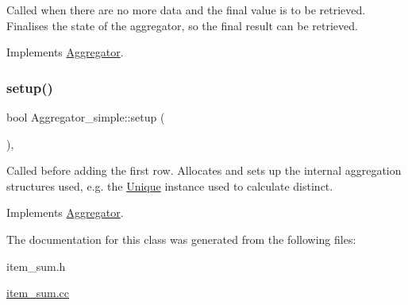 Called when there are no more data and the final value is to be retrieved. Finalises the state of the aggregator, so the final result can be retrieved. 

Implements \mbox{\hyperlink{classAggregator_a726ef59a61b219b87c0a6041f8162037}{Aggregator}}.

\mbox{\label{classAggregator__simple_a5ba27dcd45b797485c888a36a5cc4bd3}} 
\subsubsection{\texorpdfstring{setup()}{setup()}}
{\footnotesize\ttfamily bool Aggregator\+\_\+simple\+::setup (\begin{DoxyParamCaption}\item[{T\+HD $\ast$}]{ }\end{DoxyParamCaption})\hspace{0.3cm}{\ttfamily [inline]}, {\ttfamily [virtual]}}

Called before adding the first row. Allocates and sets up the internal aggregation structures used, e.\+g. the \mbox{\hyperlink{classUnique}{Unique}} instance used to calculate distinct. 

Implements \mbox{\hyperlink{classAggregator_afcde359558a43054f7812a72498a263f}{Aggregator}}.



The documentation for this class was generated from the following files\+:\begin{DoxyCompactItemize}
\item 
item\+\_\+sum.\+h\item 
\mbox{\hyperlink{item__sum_8cc}{item\+\_\+sum.\+cc}}\end{DoxyCompactItemize}
